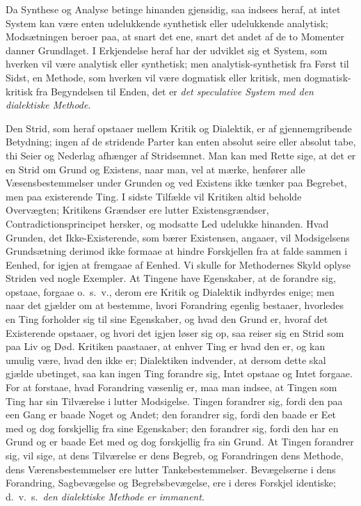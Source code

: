 \documentclass[12pt]{book}
\newcommand{\apage}[1]{\marginnote{\footnotesize\textit{[#1]}}}
\begin{document}
Da Synthese og Analyse betinge hinanden gjensidig, saa indsees heraf, at
intet System kan være enten udelukkende synthetisk eller udelukkende
analytisk; Modsætningen beroer paa, at snart det ene, snart det andet af de
to Momenter danner Grundlaget. I Erkjendelse heraf har der udviklet sig et
System, som hverken vil være analytisk eller synthetisk; men
analytisk-synthetisk fra Først til Sidst, en Methode, som \apage{77} hverken vil være
dogmatisk eller kritisk, men dogmatisk-kritisk fra Begyndelsen til Enden,
det er \emph{det speculative System med den dialektiske Methode}.

Den Strid, som heraf opstaaer mellem Kritik og Dialektik, er af
gjennemgribende Betydning; ingen af de stridende Parter kan enten absolut
seire eller absolut tabe, thi Seier og Nederlag afhænger af Stridsemnet.
Man kan med Rette sige, at det er en Strid om Grund og Existens, naar man,
vel at mærke, henfører alle Væsensbestemmelser under Grunden og ved
Existens ikke tænker paa Begrebet, men paa existerende Ting. I sidste
Tilfælde vil Kritiken altid beholde Overvægten; Kritikens Grændser ere
lutter Existensgrændser, Contradictionsprincipet hersker, og modsatte Led
udelukke hinanden. Hvad Grunden, det Ikke-Existerende, som bærer
Existensen, angaaer, vil Modsigelsens Grundsætning derimod ikke formaae at
hindre Forskjellen fra at falde sammen i Eenhed, for igjen at fremgaae af
Eenhed. Vi skulle for Methodernes Skyld oplyse Striden ved nogle Exempler.
At Tingene have Egenskaber, at de forandre sig, opstaae, forgaae o.\ s.\ v.,
derom ere Kritik og Dialektik indbyrdes enige; men naar det gjælder om at
bestemme, hvori Forandring egenlig bestaaer, hvorledes en Ting forholder
sig til sine Egenskaber, og hvad den Grund er, hvoraf det Existerende
opstaaer, og hvori det igjen løser sig op, saa reiser sig en Strid som paa
Liv og Død. Kritiken paastaaer, at enhver Ting er hvad den er, og kan
umulig være, hvad den ikke er; Dialektiken indvender, at dersom dette skal
gjælde ubetinget, saa \apage{78} kan ingen Ting forandre sig, Intet opstaae og Intet
forgaae. For at forstaae, hvad Forandring væsenlig er, maa man indsee, at
Tingen som Ting har sin Tilværelse i lutter Modsigelse. Tingen forandrer
sig, fordi den paa een Gang er baade Noget og Andet; den forandrer sig,
fordi den baade er Eet med og dog forskjellig fra sine Egenskaber; den
forandrer sig, fordi den har en Grund og er baade Eet med og dog
forskjellig fra sin Grund. At Tingen forandrer sig, vil sige, at dens
Tilværelse er dens Begreb, og Forandringen dens Methode, dens
Værensbestemmelser ere lutter Tankebestemmelser. Bevægelserne i dens
Forandring, Sagbevægelse og Begrebsbevægelse, ere i deres Forskjel
identiske; d.\ v.\ s.\ \emph{den dialektiske Methode er immanent}.
\end{document}
